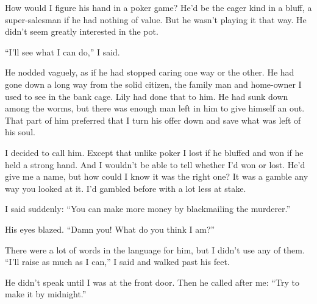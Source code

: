{How would I figure his hand in a poker game? He’d be the eager kind in a bluff, a super-salesman if he had nothing of value. But he wasn’t playing it that way. He didn’t seem greatly interested in the pot.

“I’ll see what I can do,” I said.

He nodded vaguely, as if he had stopped caring one way or the other. He had gone down a long way from the solid citizen, the family man and home-owner I used to see in the bank cage. Lily had done that to him. He had sunk down among the worms, but there was enough man left in him to give himself an out. That part of him preferred that I turn his offer down and save what was left of his soul.

I decided to call him. Except that unlike poker I lost if he bluffed and won if he held a strong hand. And I wouldn’t be able to tell whether I’d won or lost. He’d give me a name, but how could I know it was the right one? It was a gamble any way you looked at it. I’d gambled before with a lot less at stake.

I said suddenly: “You can make more money by blackmailing the murderer.”

His eyes blazed. “Damn you! What do you think I am?”

There were a lot of words in the language for him, but I didn’t use any of them. “I’ll raise as much as I can,” I said and walked past his feet.

He didn’t speak until I was at the front door. Then he called after me: “Try to make it by midnight.”

}

\vspace{2\nbs}
\clearpage
\thispagestyle{empty}


